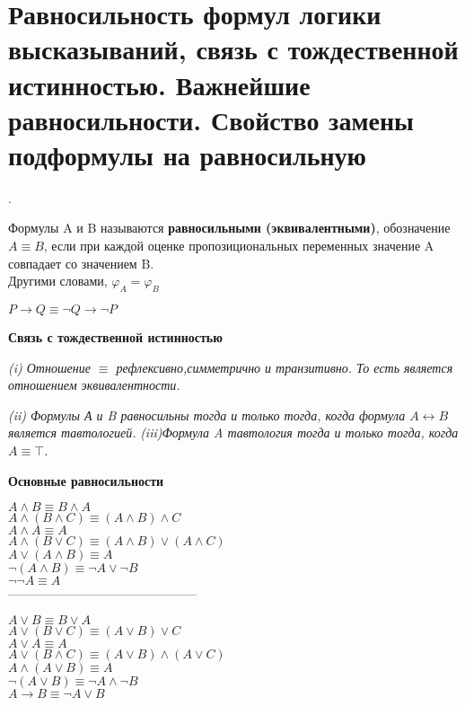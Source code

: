 \section{Равносильность формул логики высказываний, связь с тождественной истинностью. Важнейшие равносильности.
Свойство замены подформулы на равносильную}.
\begin{definition}
	Формулы A и B называются \textbf{равносильными (эквивалентными)}, обозначение $A\equiv B$,
	если при каждой оценке пропозициональных переменных значение A совпадает со значением B.\\
	Другими словами, $\varphi_A=\varphi_B$ \label{formula}
\end{definition}
\begin{example}
	${P}\to{Q}  \equiv \neg Q\to{\neg P} $
\end{example}

\begin{center}
	\textbf{Связь с тождественной истинностью}
\end{center}

\textit{(i) Отношение $\equiv$ рефлексивно,симметрично и
транзитивно. То есть является отношением эквивалентности.}

\textit{(ii) Формулы А и B равносильны тогда и только тогда, когда формула ${A}\leftrightarrow{B}$ является
тавтологией.}
\textit{(iii)Формула A тавтология тогда и только тогда, когда ${A}\equiv \top $.}

\begin{center}
	\textbf{Основные равносильности}

	$A \wedge B  \equiv B \wedge A $ \\
	$A \wedge(B \wedge C)  \equiv(A \wedge B) \wedge C $ \\
	$A \wedge A  \equiv A $ \\
	$A \wedge(B \vee C)  \equiv(A \wedge B) \vee(A \wedge C)$ \\
	$A \vee(A \wedge B)  \equiv A$ \\
	$ \neg(A \wedge B)  \equiv \neg A \vee \neg B$ \\
	$\neg \neg A  \equiv  A $ \\
	{---------------------------------------------}

	$A \vee B  \equiv B \vee A $\\
	$A \vee(B \vee C)  \equiv(A \vee B) \vee C $ \\
	$A \vee A  \equiv A $  \\
	$A \vee(B \wedge C)  \equiv(A \vee B) \wedge(A \vee C) $ \\
	$A \wedge(A \vee B)  \equiv A $ \\
	$\neg(A \vee B)  \equiv \neg A \wedge \neg B $ \\
	$A \rightarrow B  \equiv \neg A \vee B $

\end{center}


